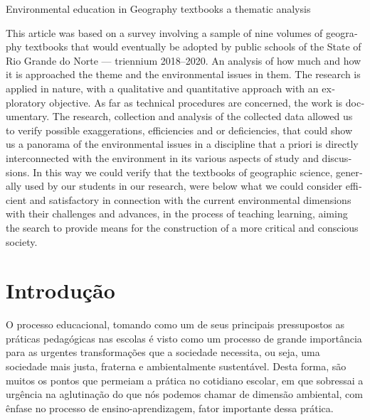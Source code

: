 \begin{refsection}

    \begin{otherlanguage}{english}

        \fakeChapterTwoLines
        {Environmental education in Geography textbooks}
        {a thematic analysis}
    
        \begin{galoResumo}[Abstract]
            This article was based on a survey involving a sample of nine volumes of geography textbooks that would eventually be adopted by public schools of the State of Rio Grande do Norte --- triennium 2018--2020. An analysis of how much and how it is approached the theme and the environmental issues in them. The research is applied in nature, with a qualitative and quantitative approach with an exploratory objective. As far as technical procedures are concerned, the work is documentary. The research, collection and analysis of the collected data allowed us to verify possible exaggerations, efficiencies and or deficiencies, that could show us a panorama of the environmental issues in a discipline that a priori is directly interconnected with the environment in its various aspects of study and discussions. In this way we could verify that the textbooks of geographic science, generally used by our students in our research, were below what we could consider efficient and satisfactory in connection with the current environmental dimensions with their challenges and advances, in the process of teaching learning, aiming the search to provide means for the construction of a more critical and conscious society. 
        \end{galoResumo}
        
    \end{otherlanguage}


    \section{Introdução}

    O processo educacional, tomando como um de seus principais pressupostos as práticas pedagógicas nas escolas é visto como um processo de grande importância para as urgentes transformações que a sociedade necessita, ou seja, uma sociedade mais justa, fraterna e ambientalmente sustentável. Desta forma, são muitos os pontos que permeiam a prática no cotidiano escolar, em que sobressai a urgência na aglutinação do que nós podemos chamar de dimensão ambiental, com ênfase no processo de ensino-aprendizagem, fator importante dessa prática.  


\end{refsection}
